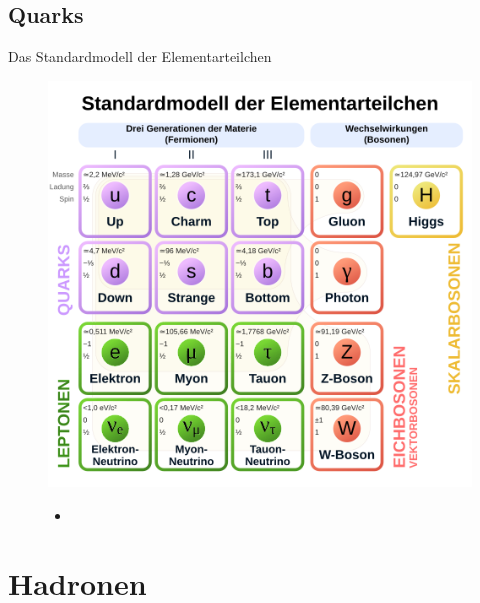 \documentclass[aspectratio=169]{beamer} %
\begin{document}
    \subsection{Quarks}
    \begin{frame}{Das Standardmodell der Elementarteilchen}
      \begin{figure}
        \centering
        \begin{minipage}{0.5\textwidth}
          \centering
          \includegraphics[width=\linewidth, keepaspectratio, height=\textheight, viewport=0 185 325 440, clip]{502px-Standard_Model_of_Elementary_Particles-de.svg.png}
          \tiny
           \end{minipage}
        \hfill
        \begin{minipage}{0.48\textwidth}
          \begin{itemize}
            \item 
          \end{itemize}
          \end{minipage}
      \end{figure}
    \end{frame}

    \section{Hadronen}
\end{document}
